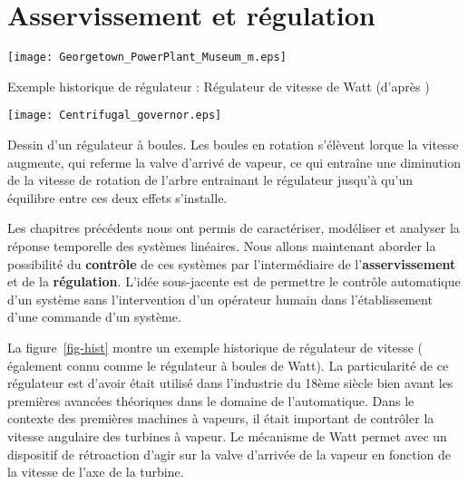 \section{Asservissement et régulation}
\begin{marginfigure}
    \centering
    \texttt{[image: Georgetown\_PowerPlant\_Museum\_m.eps]}
    \caption{Exemple historique de régulateur : Régulateur 
             de vitesse de Watt (d'après \cite{watt})\label{fig-hist}}
\end{marginfigure}
\begin{marginfigure}
    \centering
    \texttt{[image: Centrifugal\_governor.eps]} 
    \caption*{Dessin d'un régulateur à boules. Les boules en rotation s'élèvent 
    lorque la vitesse augmente, qui referme la valve d'arrivé de vapeur, ce qui 
    entraîne une diminution de la vitesse de rotation de l'arbre entrainant 
    le régulateur jusqu'à qu'un équilibre entre ces deux effets s'installe.}
\end{marginfigure}
Les chapitres précédents nous ont permis de caractériser, modéliser et
analyser la réponse temporelle des systèmes linéaires.
Nous allons maintenant aborder la possibilité du \textbf{contrôle} de ces 
systèmes par l'intermédiaire de l'\textbf{asservissement} et de 
la \textbf{régulation}. 
L'idée sous-jacente est de permettre le contrôle automatique d'un système
sans l'intervention d'un opérateur humain dans l'établissement d'une commande
d'un système. 

La figure~\ref{fig-hist} montre un exemple historique de régulateur de 
vitesse ( également connu comme le régulateur à boules de Watt). 
La particularité de ce régulateur est d'avoir était utilisé dans l'industrie
du 18ème siècle bien avant les premières avancées théoriques dans le domaine 
de l'automatique. Dans le contexte des premières machines à vapeurs, 
il était important de contrôler la vitesse angulaire des turbines à vapeur. 
Le mécanisme de Watt permet avec un dispositif de rétroaction d'agir sur la 
valve d'arrivée de la vapeur en fonction de la vitesse de l'axe de la turbine.

